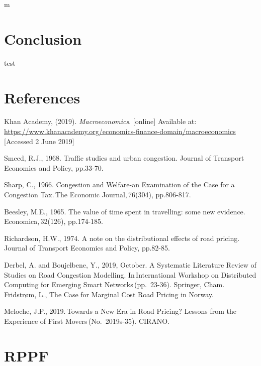 \documentclass[
      a4paper,
        12pt,
          oneside,
      ]{article}
\begin{document}
m

\hypertarget{conclusion}{%
\section{Conclusion}\label{conclusion}}

test

\hypertarget{references}{%
\section{References}\label{references}}

Khan Academy, (2019). \emph{Macroeconomics}. {[}online{]} Available at:
\url{https://www.khanacademy.org/economics-finance-domain/macroeconomics}
{[}Accessed 2 June 2019{]}

Smeed, R.J., 1968. Traffic studies and urban congestion. Journal of
Transport Economics and Policy, pp.33-70.

Sharp, C., 1966. Congestion and Welfare-an Examination of the Case for a
Congestion Tax.\,The Economic Journal,\,76(304), pp.806-817.

Beesley, M.E., 1965. The value of time spent in travelling: some new
evidence.\,Economica,\,32(126), pp.174-185.

Richardson, H.W., 1974. A note on the distributional effects of road
pricing.\,Journal of Transport Economics and Policy, pp.82-85.

Derbel, A. and Boujelbene, Y., 2019, October. A Systematic Literature
Review of Studies on Road Congestion Modelling. In\,International
Workshop on Distributed Computing for Emerging Smart
Networks\,(pp.~23-36). Springer, Cham. Fridstrøm, L., The Case for
Marginal Cost Road Pricing in Norway.

Meloche, J.P., 2019.\,Towards a New Era in Road Pricing? Lessons from
the Experience of First Movers\,(No.~2019s-35). CIRANO.

\hypertarget{rppf}{%
\section{RPPF}\label{rppf}}
\end{document}
